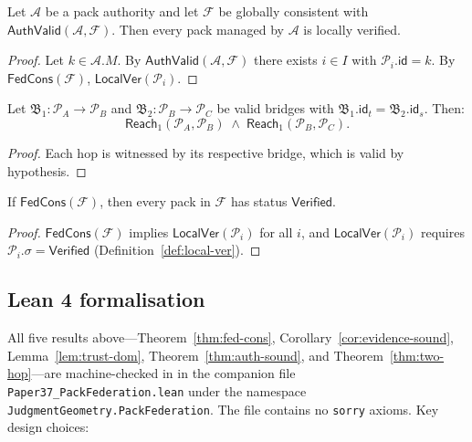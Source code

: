 \documentclass[11pt]{article}
\newcommand{\Pack}{\mathcal{P}}
\newcommand{\FedSys}{\mathcal{F}}
\newcommand{\PAuth}{\mathcal{A}}
\newcommand{\Brid}{\mathfrak{B}}
\newcommand{\PackId}{\mathsf{id}}
\newcommand{\PackSt}{\sigma}
\newcommand{\LocalVer}{\mathsf{LocalVer}}
\newcommand{\FedCons}{\ensuremath{\mathsf{FedCons}}}
\newcommand{\AuthValid}{\ensuremath{\mathsf{AuthValid}}}
\newcommand{\Reach}{\ensuremath{\mathsf{Reach}}}
\begin{document}
\begin{theorem}
\label{thm:auth-sound}
Let $\PAuth$ be a pack authority and let $\FedSys$ be globally
consistent with $\AuthValid(\PAuth, \FedSys)$.  Then every pack managed
by $\PAuth$ is locally verified.
\end{theorem}
\begin{proof}
Let $k \in \PAuth.M$.  By $\AuthValid(\PAuth, \FedSys)$ there exists
$i \in I$ with $\Pack_i.\PackId = k$.  By $\FedCons(\FedSys)$,
$\LocalVer(\Pack_i)$.
\end{proof}

\begin{theorem}
\label{thm:two-hop}
Let $\Brid_1 : \Pack_A \to \Pack_B$ and $\Brid_2 : \Pack_B \to \Pack_C$
be valid bridges with $\Brid_1.\PackId_t = \Brid_2.\PackId_s$.
Then:
\[
  \Reach_1(\Pack_A, \Pack_B)
  \;\wedge\;
  \Reach_1(\Pack_B, \Pack_C).
\]
\end{theorem}
\begin{proof}
Each hop is witnessed by its respective bridge, which is valid by
hypothesis.
\end{proof}

\begin{corollary}
\label{cor:all-verified}
If $\FedCons(\FedSys)$, then every pack in $\FedSys$ has status
$\mathsf{Verified}$.
\end{corollary}
\begin{proof}
$\FedCons(\FedSys)$ implies $\LocalVer(\Pack_i)$ for all $i$, and
$\LocalVer(\Pack_i)$ requires $\Pack_i.\PackSt = \mathsf{Verified}$
(Definition~\ref{def:local-ver}).
\end{proof}

\subsection{Lean 4 formalisation}

All five results above---Theorem~\ref{thm:fed-cons},
Corollary~\ref{cor:evidence-sound}, Lemma~\ref{lem:trust-dom},
Theorem~\ref{thm:auth-sound}, and Theorem~\ref{thm:two-hop}---are
machine-checked in \LEAN{} in the companion file
\texttt{Paper37\_PackFederation.lean} under the namespace
\texttt{JudgmentGeometry.PackFederation}.  The file contains no
\texttt{sorry} axioms.  Key design choices:
\end{document}
